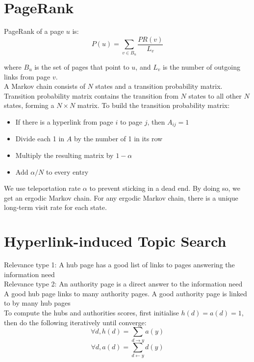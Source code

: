 \begin{multicols*}{2}
\section{PageRank}

\noindent PageRank of a page $u$ is:
$$P(u) = \sum_{v \in B_u} \frac{PR(v)}{L_v}$$

\noindent where $B_u$ is the set of pages that point to $u$, and $L_v$ is the number of outgoing links from page $v$.\\

\noindent A Markov chain consists of $N$ states and a transition probability matrix. Transition probability matrix contains the transition from $N$ states to all other $N$ states, forming a $N\times N$ matrix. To build the transition probability matrix:

\begin{itemize}
    \item If there is a hyperlink from page $i$ to page $j$, then $A_{ij} = 1$
    \item Divide each 1 in $A$ by the number of 1 in its row
    \item Multiply the resulting matrix by $1 - \alpha$
    \item Add $\alpha / N$ to every entry
\end{itemize}
\noindent We use teleportation rate $\alpha$ to prevent sticking in a dead end. By doing so, we get an ergodic Markov chain. For any ergodic Markov chain, there is a unique long-term visit rate for each state. 

\section{Hyperlink-induced Topic Search}
\noindent Relevance type 1: A hub page has a good list of links to pages answering the information need\\

\noindent Relevance type 2: An authority page is a direct answer to the information need\\

\noindent A good hub page links to many authority pages. A good authority page is linked to by many hub pages\\

\noindent To compute the hubs and authorities scores, first initialise $h(d) = a(d) = 1$, then do the following iteratively until converge:
$$\forall d, h(d) = \sum_{d\rightarrow y} a(y)$$
$$\forall d, a(d) = \sum_{d\leftarrow y} d(y)$$


\end{multicols*}
